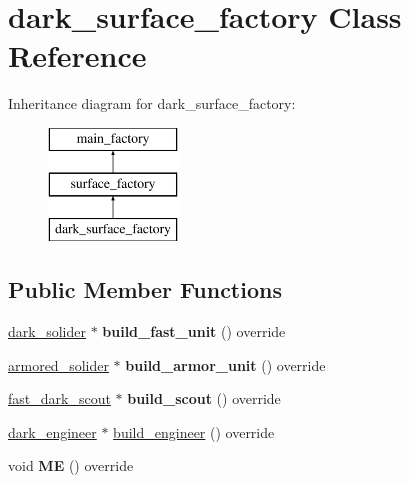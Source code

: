 \hypertarget{classdark__surface__factory}{}\section{dark\+\_\+surface\+\_\+factory Class Reference}
\label{classdark__surface__factory}
Inheritance diagram for dark\+\_\+surface\+\_\+factory\+:\begin{figure}[H]
\begin{center}
\leavevmode
\includegraphics[height=3.000000cm]{classdark__surface__factory}
\end{center}
\end{figure}
\subsection*{Public Member Functions}
\begin{DoxyCompactItemize}
\item 
\mbox{\label{classdark__surface__factory_a6b1b974f883da80bafcad845083e7a59}} 
\mbox{\hyperlink{classdark__solider}{dark\+\_\+solider}} $\ast$ {\bfseries build\+\_\+fast\+\_\+unit} () override
\item 
\mbox{\label{classdark__surface__factory_a697d782a8318c85cd063c27a6b3a4434}} 
\mbox{\hyperlink{classarmored__solider}{armored\+\_\+solider}} $\ast$ {\bfseries build\+\_\+armor\+\_\+unit} () override
\item 
\mbox{\label{classdark__surface__factory_a91c92f8181a239e4eec7089cc77a1eb9}} 
\mbox{\hyperlink{classfast__dark__scout}{fast\+\_\+dark\+\_\+scout}} $\ast$ {\bfseries build\+\_\+scout} () override
\item 
\mbox{\hyperlink{classdark__engineer}{dark\+\_\+engineer}} $\ast$ \mbox{\hyperlink{classdark__surface__factory_a70172395b97a039eed8e3ff193f9f6a6}{build\+\_\+engineer}} () override
\item 
\mbox{\label{classdark__surface__factory_a20551ad19f38e2338fce0030d6ae4cb3}} 
void {\bfseries ME} () override
\end{DoxyCompactItemize}

